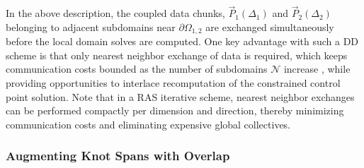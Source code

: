 In the above description, the coupled data chunks, $\vec{P}_1(\Delta_1)$ and $\vec{P}_2(\Delta_2)$ belonging to adjacent subdomains near $\partial \Omega_{1,2}$ are exchanged simultaneously before the local domain solves are computed. %
One key advantage with such a DD scheme is that only nearest neighbor exchange of data is required, which keeps communication costs bounded as the number of subdomains $\mathcal{N}$ increase \cite{orasm-as-ms-2007, gander-rasm}, while providing opportunities to interlace recomputation of the constrained control point solution. Note that in a RAS iterative scheme, nearest neighbor exchanges can be performed compactly per dimension and direction, thereby minimizing communication costs and eliminating expensive global collectives.


\subsubsection*{Augmenting Knot Spans with Overlap}

